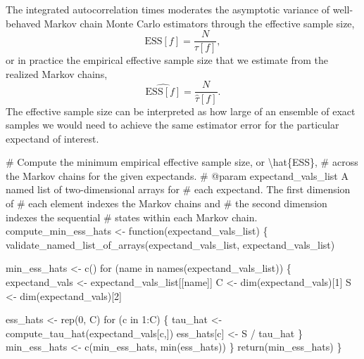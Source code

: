 \documentclass[
  letterpaper,
  DIV=11,
  numbers=noendperiod]{scrartcl}
\newenvironment{Shaded}{\begin{snugshade}}{\end{snugshade}}
\newcommand{\BuiltInTok}[1]{\textcolor[rgb]{0.00,0.23,0.31}{#1}}
\newcommand{\CommentTok}[1]{\textcolor[rgb]{0.37,0.37,0.37}{#1}}
\newcommand{\ControlFlowTok}[1]{\textcolor[rgb]{0.00,0.23,0.31}{#1}}
\newcommand{\DecValTok}[1]{\textcolor[rgb]{0.68,0.00,0.00}{#1}}
\newcommand{\KeywordTok}[1]{\textcolor[rgb]{0.00,0.23,0.31}{#1}}
\newcommand{\NormalTok}[1]{\textcolor[rgb]{0.00,0.23,0.31}{#1}}
\newcommand{\OperatorTok}[1]{\textcolor[rgb]{0.37,0.37,0.37}{#1}}
\newcommand{\StringTok}[1]{\textcolor[rgb]{0.13,0.47,0.30}{#1}}
\begin{document}
The integrated autocorrelation times moderates the asymptotic variance
of well-behaved Markov chain Monte Carlo estimators through the
effective sample size, \[
\text{ESS}[f] = \frac{N}{\tau[f]},
\] or in practice the empirical effective sample size that we estimate
from the realized Markov chains, \[
\hat{\text{ESS}[f]} = \frac{N}{\hat{\tau}[f]}.
\] The effective sample size can be interpreted as how large of an
ensemble of exact samples we would need to achieve the same estimator
error for the particular expectand of interest.

\begin{Shaded}
\begin{Highlighting}[]
\CommentTok{\# Compute the minimum empirical effective sample size, or \textbackslash{}hat\{ESS\},}
\CommentTok{\# across the Markov chains for the given expectands.}
\CommentTok{\# @param expectand\_vals\_list A named list of two{-}dimensional arrays for}
\CommentTok{\#                            each expectand.  The first dimension of}
\CommentTok{\#                            each element indexes the Markov chains and}
\CommentTok{\#                            the second dimension indexes the sequential}
\CommentTok{\#                            states within each Markov chain.}
\NormalTok{compute\_min\_ess\_hats }\OperatorTok{\textless{}{-}}\NormalTok{ function(expectand\_vals\_list) \{}
\NormalTok{  validate\_named\_list\_of\_arrays(expectand\_vals\_list,}
                                \StringTok{\textquotesingle{}expectand\_vals\_list\textquotesingle{}}\NormalTok{)}

\NormalTok{  min\_ess\_hats }\OperatorTok{\textless{}{-}}\NormalTok{ c()}
  \ControlFlowTok{for}\NormalTok{ (name }\KeywordTok{in}\NormalTok{ names(expectand\_vals\_list)) \{}
\NormalTok{    expectand\_vals }\OperatorTok{\textless{}{-}}\NormalTok{ expectand\_vals\_list[[name]]}
\NormalTok{    C }\OperatorTok{\textless{}{-}}\NormalTok{ dim(expectand\_vals)[}\DecValTok{1}\NormalTok{]}
\NormalTok{    S }\OperatorTok{\textless{}{-}}\NormalTok{ dim(expectand\_vals)[}\DecValTok{2}\NormalTok{]}
    
\NormalTok{    ess\_hats }\OperatorTok{\textless{}{-}}\NormalTok{ rep(}\DecValTok{0}\NormalTok{, C)}
    \ControlFlowTok{for}\NormalTok{ (c }\KeywordTok{in} \DecValTok{1}\NormalTok{:C) \{}
\NormalTok{      tau\_hat }\OperatorTok{\textless{}{-}}\NormalTok{ compute\_tau\_hat(expectand\_vals[c,])}
\NormalTok{      ess\_hats[c] }\OperatorTok{\textless{}{-}}\NormalTok{ S }\OperatorTok{/}\NormalTok{ tau\_hat}
\NormalTok{    \}}
\NormalTok{    min\_ess\_hats }\OperatorTok{\textless{}{-}}\NormalTok{ c(min\_ess\_hats, }\BuiltInTok{min}\NormalTok{(ess\_hats))}
\NormalTok{  \}}
  \ControlFlowTok{return}\NormalTok{(min\_ess\_hats)}
\NormalTok{\}}
\end{Highlighting}
\end{Shaded}
\end{document}
